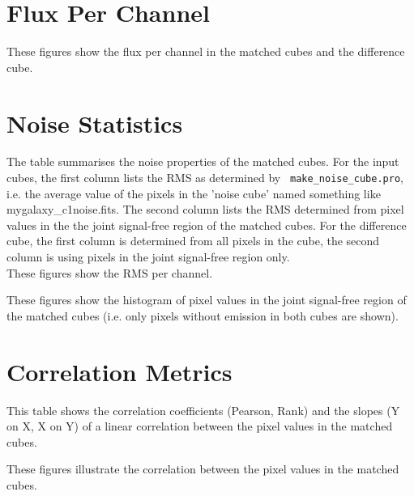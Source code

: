 \documentclass[11pt]{article}
\begin{document}
\section{Flux Per Channel}
\label{sect:perchannel}
%
These figures show the flux per channel in the matched cubes and the difference cube.




%

\section{Noise Statistics}
\label{sec:noise_stats}

\noindent The table summarises the noise properties of the matched cubes. For the
input cubes, the first column lists the RMS as determined by {\tt
  make\_noise\_cube.pro}, i.e. the average value of the pixels in the
'noise cube' named something like mygalaxy\_c1noise.fits. The second
column lists the RMS determined from pixel values in the the joint
signal-free region of the matched cubes. For the difference cube, the
first column is determined from all pixels in the cube, the second
column is using pixels in the joint signal-free region only.\\



\noindent These figures show the RMS per channel.




\noindent These figures show the histogram of pixel values in the
joint signal-free region of the matched cubes (i.e. only pixels
without emission in both cubes are shown).





\section{Correlation Metrics}
\label{sec:correlation_stats}

\noindent This table shows the correlation coefficients (Pearson,
Rank) and the slopes (Y on X, X on Y) of a linear correlation between
the pixel values in the matched cubes.



\noindent These figures illustrate the correlation between the pixel
values in the matched cubes.
\end{document}
